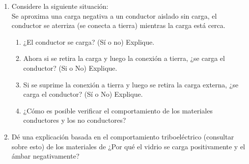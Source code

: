 \begin{enumerate}
\begin{enumerate}
        \item Considere la siguiente situación:\\
        Se aproxima una carga negativa a un conductor aislado sin carga, el
        conductor se aterriza (se conecta a tierra) mientras la carga está cerca.

        \begin{enumerate}
            \item ¿El conductor se carga? (Sí o no) Explique.
            \item Ahora si se retira la carga y luego la conexión a tierra,
            ¿se carga el conductor? (Si o No) Explique.
            \item Si se suprime la conexión a tierra y luego se retira la carga
            externa, ¿se carga el conductor? (Sí o No) Explique.
            \item ¿Cómo es posible verificar el comportamiento de los materiales
            conductores y los no conductores?
        \end{enumerate}

        \item Dé una explicación basada en el comportamiento triboeléctrico
        (consultar sobre esto) de los materiales de ¿Por qué el vidrio se carga
        positivamente y el ámbar negativamente?

    \end{enumerate}
\end{enumerate}
